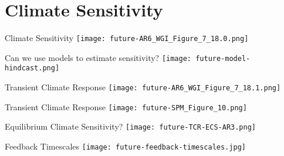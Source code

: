\section{Climate Sensitivity}

\begin{frame}{Climate Sensitivity}
    \centering
    \texttt{[image: future-AR6\_WGI\_Figure\_7\_18.0.png]}
\end{frame}




\begin{frame}{Can we use models to estimate sensitivity?}
    \centering
    \texttt{[image: future-model-hindcast.png]}


\end{frame}

\begin{frame}{Transient Climate Response}
    \centering
    \texttt{[image: future-AR6\_WGI\_Figure\_7\_18.1.png]}
\end{frame}

\begin{frame}{Transient Climate Response}
    \centering
    \texttt{[image: future-SPM\_Figure\_10.png]}
\end{frame}

\begin{frame}{Equilibrium Climate Sensitivity?}
    \centering
    \texttt{[image: future-TCR-ECS-AR3.png]}
\end{frame}

\begin{frame}{Feedback Timescales}
    \centering
    \texttt{[image: future-feedback-timescales.jpg]}
\end{frame}


